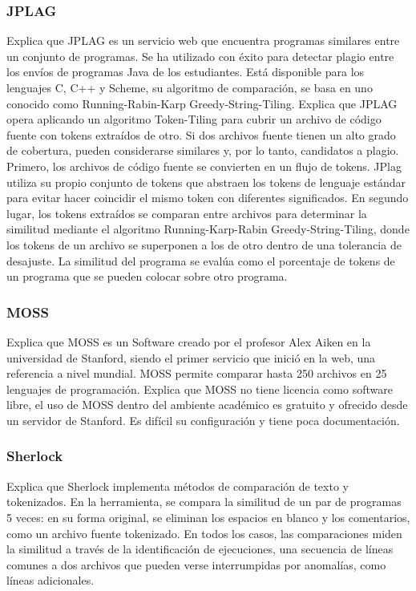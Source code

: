 


\subsubsection{JPLAG}
\cite{Prechelt2003} Explica que JPLAG es un servicio web que encuentra programas similares entre un conjunto de programas. Se ha utilizado con éxito para detectar plagio entre los envíos de programas Java de los estudiantes. Está disponible para los lenguajes C, C++ y Scheme, su algoritmo de comparación, se basa en uno conocido como Running-Rabin-Karp Greedy-String-Tiling. \cite{Cheers2021} Explica que JPLAG opera aplicando un algoritmo Token-Tiling para cubrir un archivo de código fuente con tokens extraídos de otro. Si dos archivos fuente tienen un alto grado de cobertura, pueden considerarse similares y, por lo tanto, candidatos a plagio. Primero, los archivos de código fuente se convierten en un flujo de tokens. JPlag utiliza su propio conjunto de tokens que abstraen los tokens de lenguaje estándar para evitar hacer coincidir el mismo token con diferentes significados. En segundo lugar, los tokens extraídos se comparan entre archivos para determinar la similitud mediante el algoritmo Running-Karp-Rabin Greedy-String-Tiling, donde los tokens de un archivo se superponen a los de otro dentro de una tolerancia de desajuste. La similitud del programa se evalúa como el porcentaje de tokens de un programa que se pueden colocar sobre otro programa.
\subsubsection{MOSS}
\cite{Hage2010} Explica que MOSS es un Software creado por el profesor Alex Aiken en la universidad de Stanford, siendo el primer servicio que inició en la web, una referencia a nivel mundial. MOSS permite comparar hasta 250 archivos en 25 lenguajes de programación. \cite{Pachon2019} Explica que MOSS no tiene licencia como software libre, el uso de MOSS dentro del ambiente académico es gratuito y ofrecido desde un servidor de Stanford. Es difícil su configuración y tiene poca documentación.
\subsubsection{Sherlock}
\cite{Cheers2021} Explica que Sherlock implementa métodos de comparación de texto y tokenizados. En la herramienta, se compara la similitud de un par de programas 5 veces: en su forma original, se eliminan los espacios en blanco y los comentarios, como un archivo fuente tokenizado. En todos los casos, las comparaciones miden la similitud a través de la identificación de ejecuciones, una secuencia de líneas comunes a dos archivos que pueden verse interrumpidas por anomalías, como líneas adicionales.


